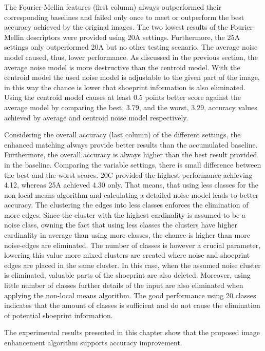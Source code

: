 \documentclass[draft,final]{vutinfth} %
\begin{document}
\par
The Fourier-Mellin features (first column) always outperformed their corresponding baselines and failed only once to meet or outperform the best accuracy achieved by the original images.
The two lowest results of the Fourier-Mellin descriptors were provided using 20A settings.
Furthermore, the 25A settings only outperformed 20A but no other testing scenario.
The average noise model caused, thus, lower performance.
As discussed in the previous section, the average noise model is more destructive than the centroid model.
With the centroid model the used noise model is adjustable to the given part of the image, in this way the chance is lower that shoeprint information is also eliminated. 
Using the centroid model causes at least 0.5 points better score against the average model by comparing the best, 3.79, and the worst, 3.29, accuracy values achieved by average and centroid noise model respectively.
\par
Considering the overall accuracy (last column) of the different settings, the enhanced matching always provide better results than the accumulated baseline.
Furthermore, the overall accuracy is always higher than the best result provided in the baseline.
Comparing the variable settings, there is small difference between the best and the worst scores.
20C provided the highest performance achieving 4.12, whereas 25A achieved 4.30 only.
That means, that using less classes for the non-local means algorithm and calculating a detailed noise model leads to better accuracy.
The clustering the edges into less classes enforces the elimination of more edges.
Since the cluster with the highest cardinality is assumed to be a noise class,  owning the fact that using less classes the clusters have higher cardinality  in average than using more classes, the chance is higher than more noise-edges are eliminated.
The number of classes is however a crucial parameter, lowering this value more mixed clusters are created where noise and shoeprint edges are placed in the same cluster.
In this case, when the assumed noise cluster is eliminated, valuable parts of the shoeprint are also deleted.
Moreover, using little number of classes further details of the input are also eliminated when applying the non-local means algorithm.
The good performance using 20 classes indicates that the amount of classes is sufficient and do not cause the elimination of potential shoeprint information.
\par
The experimental results presented in this chapter show that the proposed image enhancement algorithm supports accuracy improvement.
\end{document}

